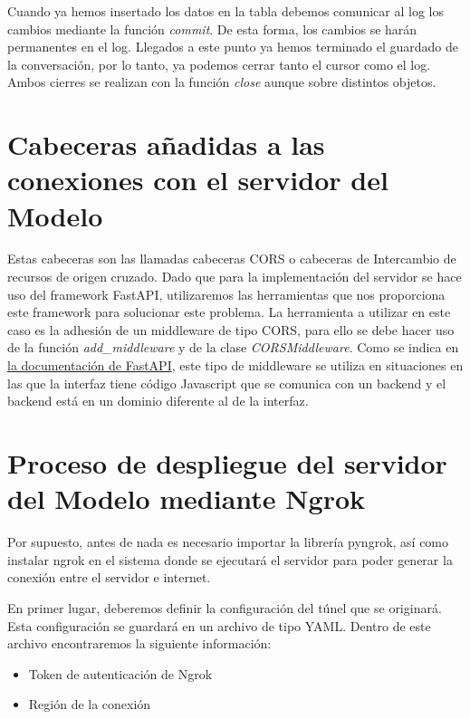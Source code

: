 Cuando ya hemos insertado los datos en la tabla debemos comunicar al log los cambios mediante la función \textit{commit}. De esta forma, los cambios se harán permanentes en el log. Llegados a este punto ya hemos terminado el guardado de la conversación, por lo tanto, ya podemos cerrar tanto el cursor como el log. Ambos cierres se realizan con la función \textit{close} aunque sobre distintos objetos.


\section{Cabeceras añadidas a las conexiones con el servidor del Modelo} \label{sec:cabecera_conexion_Modelo}

Estas cabeceras son las llamadas cabeceras CORS o cabeceras de Intercambio de recursos de origen cruzado. Dado que para la implementación del servidor se hace uso del framework FastAPI, utilizaremos las herramientas que nos proporciona este framework para solucionar este problema. La herramienta a utilizar en este caso es la adhesión de un middleware de tipo CORS, para ello se debe hacer uso de la función \textit{add\_middleware} y de la clase \textit{CORSMiddleware}. Como se indica en \href{https://fastapi.tiangolo.com/tutorial/cors/}{la documentación de FastAPI}, este tipo de middleware se utiliza en situaciones en las que la interfaz tiene código Javascript que se comunica con un backend y el backend está en un dominio diferente al de la interfaz.


\section{Proceso de despliegue del servidor del Modelo mediante Ngrok} \label{sec:proce_despli_server_Modelo}

Por supuesto, antes de nada es necesario importar la librería pyngrok, así como instalar ngrok en el sistema donde se ejecutará el servidor para poder generar la conexión entre el servidor e internet. 
 
 En primer lugar, deberemos definir la configuración del túnel que se originará. Esta configuración se guardará en un archivo de tipo YAML. Dentro de este archivo encontraremos la siguiente información:

\begin{itemize}
\item Token de autenticación de Ngrok
\item Región de la conexión
\end{itemize}

